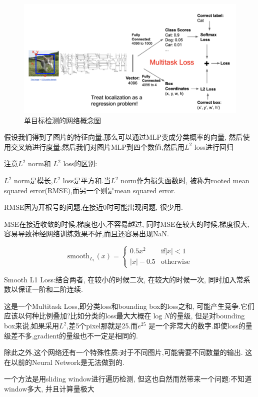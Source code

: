 \begin{figure}[htbp]
    \centering
    \includegraphics[scale=0.55]{figures/single_obj_det.png}
    \caption{单目标检测的网络概念图}
\end{figure}

假设我们得到了图片的特征向量,那么可以通过MLP变成分类概率的向量,
然后使用交叉熵进行度量;然后我们对图片MLP到四个数值,然后用$L^2$ 
loss进行回归

注意$L^2$ norm和 $L^2$ loss的区别:

$L^2$ norm是模长,$L^2$ loss是平方和.当$L^2$ norm作为损失函数时,
被称为rooted mean squared error(RMSE),而另一个则是mean squared error.

RMSE因为开根号的问题,在接近0时可能出现问题, 很少用.

MSE在接近收敛的时候,梯度也小,不容易越过, 同时MSE在较大的时候,梯度很大,
容易导致神经网络训练效果不好,而且还容易出现NaN.

\[\mathrm{smooth}_{L_1}(x)=\left\{\begin{array}{ll}0.5x^2&\mathrm{if}|x|<1\\|x|-0.5&\mathrm{otherwise}\end{array}\right.\]

Smooth L1 Loss:结合两者, 在较小的时候二次, 
在较大的时候一次, 同时加入常系数以保证一阶和二阶连续.

这是一个Multitask Loss,即分类loss和bounding box的loss之和,
可能产生竞争.它们应该以何种比例叠加?比如分类的loss最大大概在$\log N$的量级,
但是对bounding box来说,如果采用$L^2$,差5个pixel那就是25.而$e^{25}$
是一个非常大的数字.即使loss的量级差不多,gradient的量级也不一定是相同的.

除此之外,这个网络还有一个特殊性质:对于不同图片,可能需要不同数量的输出.
这在以前的Neural Network是无法做到的.

一个方法是用sliding window进行遍历检测,
但这也自然而然带来一个问题:不知道window多大, 并且计算量极大

